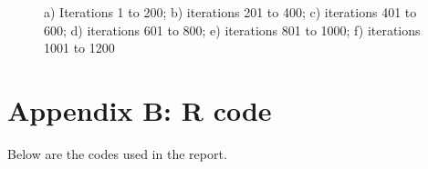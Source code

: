 \documentclass[11pt, a4paper]{article}
\begin{document}
\begin{figure}[H]
\begin{minipage}{.55\linewidth}
\end{minipage}
\begin{minipage}{.5\linewidth}
\centering
{}
\end{minipage}
\caption{a) Iterations 1 to 200; b) iterations 201 to 400; c) iterations 401 to 600; d) iterations 601 to 800; e) iterations 801 to 1000; f) iterations 1001 to 1200}
\end{figure}


\newpage
\section{Appendix B: R code}

Below are the codes used in the report.
\end{document}
